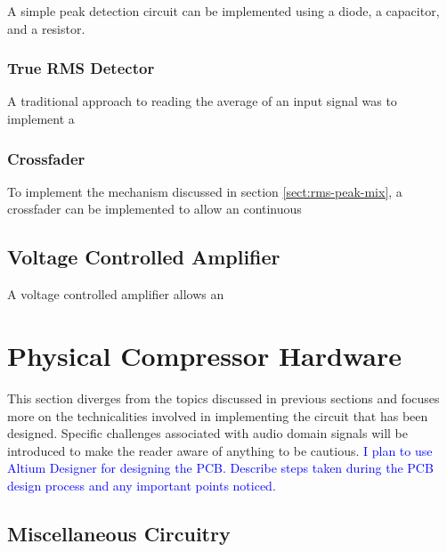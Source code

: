 \documentclass[10pt]{article}
\begin{document}
\begin{multicols*}{2}
                    A simple peak detection circuit can be implemented using a diode, a capacitor, and a resistor.

                \subsubsection{True RMS Detector}
                    A traditional approach to reading the average of an input signal was to implement a      
                    
                \subsubsection{Crossfader}
                    To implement the mechanism discussed in section \ref{sect:rms-peak-mix}, a crossfader can be implemented to allow an continuous 

            \subsection{Voltage Controlled Amplifier}
                A voltage controlled amplifier allows an 
                

        \section{Physical Compressor Hardware}
            This section diverges from the topics discussed in previous sections and focuses more on the technicalities involved in implementing the circuit that has been designed. Specific challenges associated with audio domain signals will be introduced to make the reader aware of anything to be cautious.
            \textcolor{blue}{I plan to use Altium Designer for designing the PCB. Describe steps taken during the PCB design process and any important points noticed.}

            \subsection{Miscellaneous Circuitry}


\end{multicols*}
\end{document}
